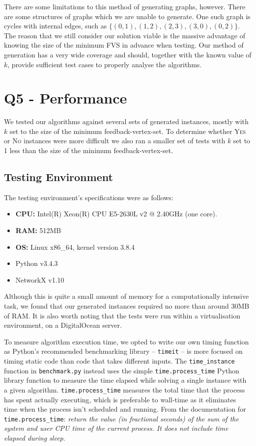 \documentclass[a4paper,12pt]{article}
\begin{document}
There are some limitations to this method of generating graphs, however. There are some structures of graphs which we are unable to generate. One such graph is cycles with internal edges, such as $\{(0,1),(1,2),(2,3),(3,0),(0,2)\}$. The reason that we still consider our solution viable is the massive advantage of knowing the size of the minimum FVS in advance when testing. Our method of generation has a very wide coverage and should, together with the known value of $k$, provide sufficient test cases to properly analyse the algorithms.

\section{Q5 - Performance}

We tested our algorithms against several sets of generated instances, mostly with $k$ set to the size of the minimum feedback-vertex-set. To determine whether \textsc{Yes} or \textsc{No} instances were more difficult we also ran a smaller set of tests with $k$ set to 1 less than the size of the minimum feedback-vertex-set.

\subsection{Testing Environment}

The testing environment's specifications were as follows:

\begin{itemize}
\item \textbf{CPU:} Intel(R) Xeon(R) CPU E5-2630L v2 @ 2.40GHz (one core).
\item \textbf{RAM:} 512MB
\item \textbf{OS:} Linux x86\_64, kernel version 3.8.4
\item Python v3.4.3
\item NetworkX v1.10
\end{itemize}

Although this is quite a small amount of memory for a computationally intensive task, we found that our generated instances required no more than around 30MB of RAM. It is also worth noting that the tests were run within a virtualisation environment, on a DigitalOcean server.

To measure algorithm execution time, we opted to write our own timing function as Python's recommended benchmarking library -- \texttt{timeit} -- is more focused on timing static code than code that takes different inputs. The \texttt{time\_instance} function in \texttt{benchmark.py} instead uses the simple \texttt{time.process\_time} Python library function to measure the time elapsed while solving a single instance with a given algorithm. \texttt{time.process\_time} measures the total time that the process has spent actually executing, which is preferable to wall-time as it eliminates time when the process isn't scheduled and running. From the documentation for \texttt{time.process\_time}: \textit{return the value (in fractional seconds) of the sum of the system and user CPU time of the current process. It does not include time elapsed during sleep}.
\end{document}
